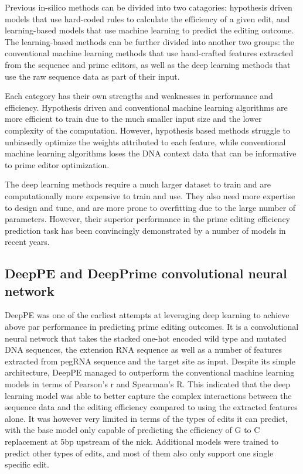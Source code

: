 Previous in-silico methods can be divided into two catagories: hypothesis driven models that use hard-coded rules to calculate the efficiency of a given edit\cite{hsuPrimeDesignSoftwareRapid2021,hwangPEDesignerPEAnalyzerWebbased2021}, and learning-based models that use machine learning to predict the editing outcome. 
The learning-based methods can be further divided into another two groups: the conventional machine learning methods that use hand-crafted features extracted from the sequence and prime editors\cite{liEasyPrimeMachineLearning2021,koeppelPredictionPrimeEditing2023}, as well as the deep learning methods that use the raw sequence data as part of their input\cite{yuPredictionEfficienciesDiverse2023,kimPredictingEfficiencyPrime2021, mathisPredictingPrimeEditing2023}. 

Each category has their own strengths and weaknesses in performance and efficiency. Hypothesis driven and conventional machine learning algorithms are more efficient to train due to the much smaller input size and the lower complexity of the computation. However, hypothesis based methods struggle to unbiasedly optimize the weights attributed to each feature\cite{liEasyPrimeMachineLearning2021}, while conventional machine learning algorithms loses the DNA context data that can be informative to prime editor optimization. 

The deep learning methods require a much larger dataset to train and are computationally more expensive to train and use. They also need more expertise to design and tune, and are more prone to overfitting due to the large number of parameters. However, their superior performance in the prime editing efficiency prediction task has been convincingly demonstrated by a number of models in recent years.


\subsection{DeepPE and DeepPrime convolutional neural network}

DeepPE was one of the earliest attempts at leveraging deep learning to achieve above par performance in predicting prime editing outcomes\cite{kimPredictingEfficiencyPrime2021}. It is a convolutional neural network that takes the stacked one-hot encoded wild type and  mutated DNA sequences, the extension RNA sequence as well as a number of features extracted from pegRNA sequence and the target site as input. Despite its simple architecture, DeepPE managed to outperform the conventional machine learning models in terms of Pearson's r and Spearman's R. This indicated that the deep learning model was able to better capture the complex interactions between the sequence data and the editing efficiency compared to using the extracted features alone. It was however very limited in terms of the types of edits it can predict, with the base model only capable of predicting the efficiency of G to C replacement at 5bp upstream of the nick. Additional models were trained to predict other types of edits, and most of them also only support one single specific edit.

